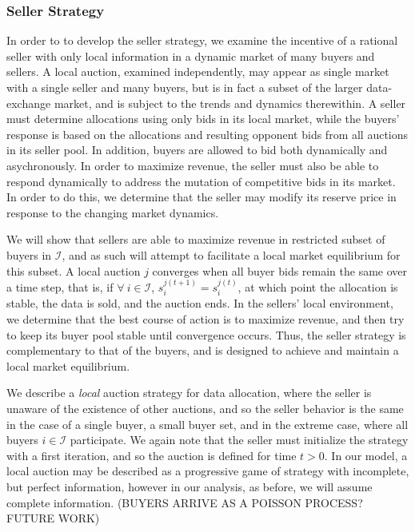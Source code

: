 \documentclass[12pt]{article}
\theoremstyle{definition}
\newcommand{\mcI}{\mathcal{I}}
\begin{document}
\begin{multicols}{2}
\subsubsection{Seller Strategy}
In order to to develop the seller strategy, we examine the incentive of a
rational seller with only local information in a dynamic market of many
buyers and sellers. A local auction, examined independently, may appear as
single market with a single seller and many buyers, but is in fact a subset of the
larger data-exchange market, and is subject to the trends and dynamics
therewithin. A seller must determine allocations using only bids in its local market, while the buyers' response is based on the
allocations and resulting opponent bids from all auctions in its seller pool.
In addition, buyers are allowed to bid both dynamically and asychronously. 
In order to
maximize revenue, the seller must also be able to respond dynamically to
address the mutation of competitive bids in its market. In order to do this, we
determine that the seller may modify its reserve price in response to the
changing market dynamics.

We will show that sellers are able to maximize revenue in restricted subset of
buyers in $\mcI$, and as such will attempt to facilitate a local market
equilibrium for this subset. A local auction $j$ converges when all buyer bids
remain the same over a time step, that is, if $\forall \ i \in\mcI$,
$s_i^{j(t+1)} = s_i^{j(t)}$, at which point the allocation is stable, the data
is sold, and the auction ends. In the sellers' local environment, we determine
that the best course of action is to maximize revenue, and then try to keep its
buyer pool stable until convergence occurs. Thus, the seller strategy is
complementary to that of the buyers, and is designed to achieve and maintain a
local market equilibrium. 

We describe a \emph{local} auction strategy for data allocation, where the seller is unaware of the existence of other auctions, and so
the seller behavior is the same in the case of a single buyer, a small buyer set, and in the
extreme case, where all buyers $i\in\mcI$ participate. We again note that the
seller must initialize the strategy with a first iteration, and so the auction
is defined for time $t>0$.
In our model, a local auction may be described as a progressive game of strategy with
incomplete, but perfect information, however in our analysis, as before, we will assume
complete information. 
(BUYERS ARRIVE AS A POISSON PROCESS? FUTURE WORK)


\end{multicols}
\end{document}
